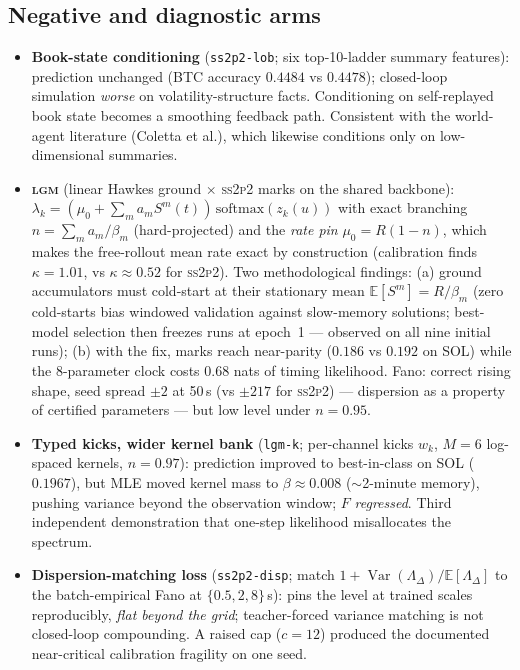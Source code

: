 \documentclass[11pt]{article}
\newcommand{\ssppp}{\textsc{ss2p2}}
\newcommand{\lgm}{\textsc{lgm}}
\newcommand{\Fano}{F}
\begin{document}
\subsection{Negative and diagnostic arms}
\begin{itemize}
\item \textbf{Book-state conditioning} (\texttt{ss2p2-lob}; six top-10-ladder
  summary features): prediction unchanged (BTC accuracy $0.4484$ vs
  $0.4478$); closed-loop simulation \emph{worse} on volatility-structure
  facts. Conditioning on self-replayed book state becomes a smoothing
  feedback path. Consistent with the world-agent literature
  (Coletta et al.), which likewise conditions only on low-dimensional
  summaries.
\item \textbf{\lgm{}} (linear Hawkes ground $\times$ \ssppp{} marks on the
  shared backbone): $\lambda_k=(\mu_0+\sum_m a_m S^m(t))\,
  \mathrm{softmax}(z_k(u))$ with exact branching $n=\sum_m a_m/\beta_m$
  (hard-projected) and the \emph{rate pin} $\mu_0=R(1-n)$, which makes the
  free-rollout mean rate exact by construction (calibration finds
  $\kappa=1.01$, vs $\kappa\approx0.52$ for \ssppp{}). Two methodological
  findings: (a) ground accumulators must cold-start at their stationary mean
  $\mathbb{E}[S^m]=R/\beta_m$ (zero cold-starts bias windowed validation
  against slow-memory solutions; best-model selection then freezes runs at
  epoch~1 --- observed on all nine initial runs); (b) with the fix, marks
  reach near-parity ($0.186$ vs $0.192$ on SOL) while the 8-parameter clock
  costs $0.68$ nats of timing likelihood. Fano: correct rising shape,
  seed spread $\pm2$ at 50\,s (vs $\pm217$ for \ssppp{}) --- dispersion as a
  property of certified parameters --- but low level under $n=0.95$.
\item \textbf{Typed kicks, wider kernel bank} (\texttt{lgm-k}; per-channel
  kicks $w_k$, $M{=}6$ log-spaced kernels, $n=0.97$): prediction improved to
  best-in-class on SOL ($0.1967$), but MLE moved kernel mass to
  $\beta\approx0.008$ ($\sim$2-minute memory), pushing variance beyond the
  observation window; $\Fano$ \emph{regressed}. Third independent
  demonstration that one-step likelihood misallocates the spectrum.
\item \textbf{Dispersion-matching loss} (\texttt{ss2p2-disp}; match
  $1+\operatorname{Var}(\Lambda_\Delta)/\mathbb{E}[\Lambda_\Delta]$ to the
  batch-empirical Fano at $\{0.5,2,8\}$\,s): pins the level at trained scales
  reproducibly, \emph{flat beyond the grid}; teacher-forced variance matching
  is not closed-loop compounding. A raised cap ($c{=}12$) produced the
  documented near-critical calibration fragility on one seed.
\end{itemize}
\end{document}
